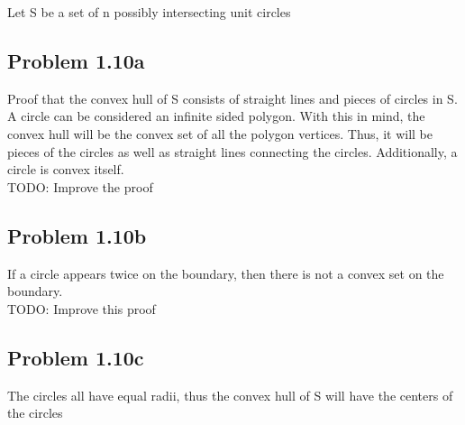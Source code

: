 \documentclass[11pt,psfig]{article}
\begin{document}
Let S be a set of n possibly intersecting unit circles

\subsection*{Problem 1.10a}

Proof that the convex hull of S consists of straight lines and pieces of circles in S. 
\\
A circle can be considered an infinite sided polygon. With this in mind, the convex hull will be the convex set of all the polygon vertices. Thus, it will be pieces of the circles as well as straight lines connecting the circles. Additionally, a circle is convex itself. 
\\
TODO: Improve the proof

\subsection*{Problem 1.10b}

If a circle appears twice on the boundary, then there is not a convex set on the boundary. 
\\
TODO: Improve this proof

\subsection*{Problem 1.10c}

The circles all have equal radii, thus the convex hull of S will have the centers of the circles




\end{document}
